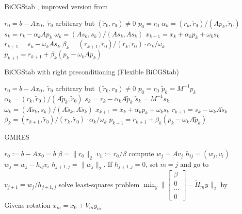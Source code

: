\documentclass[10pt]{article}
\begin{document}
\begin{algorithm}[H]
  \caption{BiCGStab \citep{chen2016analysis}, improved version from \citep{van1992bicgstab}}\label{alg:CG}
  \begin{algorithmic}[1]
    \State $r_0=b-Ax_0,$ $\tilde{r}_0$ arbitrary but $(\tilde{r}_0,r_0)\neq 0$
    \State $p_0 = r_0$
    \State $\alpha_k = (r_k , \tilde{r}_0 )/(Ap_k , \tilde{r}_0 )$
    \State $s_k=r_k-\alpha_k Ap_k$ 
    \State $\omega_k = (As_k , s_k )/(As_k , As_k ) $
    \State $x_{k+1} = x_k + \alpha_k  p_k + \omega_k s_k$
    \State $r_{k+1}=s_k-\omega_k As_k$
    \State $\beta_k = (r_{k+1},\tilde{r}_0 )/(r_k,\tilde{r}_0 )\cdot \alpha_k/\omega_k$
    \State $p_{k+1}=r_{k+1}+\beta_k(p_k-\omega_k Ap_k)$
    \EndFor
  \end{algorithmic}
\end{algorithm}

\begin{algorithm}[H]
  \caption{BiCGStab with right preconditioning (Flexible BiCGStab) \citep{chen2016analysis}}\label{alg:CG}
  \begin{algorithmic}[1]
    \State $r_0=b-Ax_0,$ $\tilde{r}_0$ arbitrary but $(\tilde{r}_0,r_0)\neq 0$
    \State $p_0 = r_0$
    \State $\tilde{p}_k=M^{-1}p_k$
    \State $\alpha_k = (r_k , \tilde{r}_0 )/(A\tilde{p}_k, \tilde{r}_0 )$
    \State $s_k=r_k-\alpha_k A\tilde{p}_k$
    \State $\tilde{s}_k=M^{-1}s_k$
    \State $\omega_k = (A\tilde{s}_k , s_k )/(A\tilde{s}_k,A\tilde{s}_k ) $
    \State $x_{k+1} = x_k + \alpha_k  p_k + \omega_k s_k$
    \State $r_{k+1}=s_k-\omega_k A\tilde{s}_k$
    \State $\beta_k = (r_{k+1},\tilde{r}_0 )/(r_k,\tilde{r}_0 )\cdot \alpha_k/\omega_k$
    \State $p_{k+1}=r_{k+1}+\beta_k(p_k-\omega_k A\tilde{p}_k)$
    \EndFor
  \end{algorithmic}
\end{algorithm}

\begin{algorithm}[H]
  \caption{GMRES \citep[algorithm 6.9]{Saad_2003_IMS}}
  \begin{algorithmic}[1]
    \State $r_0:=b-A x_0=b$
    \State $\beta=\|r_0\|_2$
    \State $v_1:=r_0/\beta$
    \State compute $w_j=Av_j$
        \State $h_{ij}=(w_j,v_i)$
        \State $w_j=w_j-h_{ij} v_i$
        \EndFor
    \State $h_{j+1,j}=\|w_j\|_2$. If $h_{j+1,j}=0$, set $m=j$ and go to
    \State $v_{j+1} = w_j/h_{j+1,j}$
    \State solve least-squares problem $\min_y\|\begin{bmatrix}
    \beta\\
    0\\
    \cdots\\
    0
    \end{bmatrix}- \tilde{H}_m y\|_2$ by Givens rotation
    \EndFor
    \State $x_m = x_0+V_m y_m$
  \end{algorithmic}
\end{algorithm}
\end{document}
